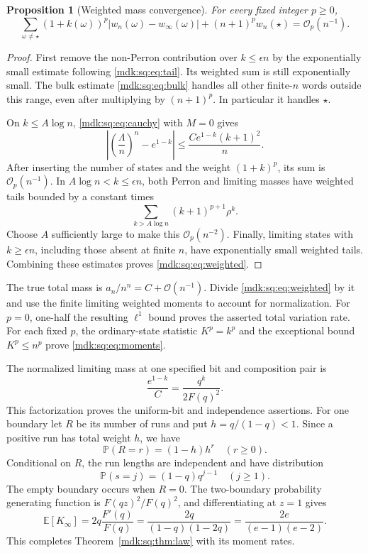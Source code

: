 \documentclass[11pt,letterpaper]{article}
\numberwithin{equation}{section}
\newtheorem{proposition}[theorem]{Proposition}
\theoremstyle{remark}\newtheorem{remark}[theorem]{Remark}
\newcommand{\Oh}{\mathcal O}\newcommand{\Q}{\mathbb Q}\newcommand{\N}{\mathbb N}\newcommand{\R}{\mathbb R}
\begin{document}
\begin{proposition}[Weighted mass convergence]\label{mdk:sq:prop:weighted}
For every fixed integer $p\ge0$,
\begin{equation}\label{mdk:sq:eq:weighted}
\sum_{\omega\ne\star}(1+k(\omega))^p
|w_n(\omega)-w_\infty(\omega)|
+(n+1)^pw_n(\star)=\Oh_p(n^{-1}).
\end{equation}
\end{proposition}
\begin{proof}
First remove the non-Perron contribution over $k\le\epsilon n$ by the exponentially small estimate following \eqref{mdk:sq:eq:tail}. Its weighted sum is still exponentially small. The bulk estimate \eqref{mdk:sq:eq:bulk} handles all other finite-$n$ words outside this range, even after multiplying by $(n+1)^p$. In particular it handles $\star$.

On $k\le A\log n$, \eqref{mdk:sq:eq:cauchy} with $M=0$ gives
\[
\left|\left(\frac\Lambda n\right)^n-e^{1-k}\right|
\le\frac{C e^{1-k}(k+1)^2}{n}.
\]
After inserting the number of states and the weight $(1+k)^p$, its sum is $\Oh_p(n^{-1})$. In $A\log n<k\le\epsilon n$, both Perron and limiting masses have weighted tails bounded by a constant times
\[
\sum_{k>A\log n}(k+1)^{p+1}\rho^k.
\]
Choose $A$ sufficiently large to make this $\Oh_p(n^{-2})$. Finally, limiting states with $k\ge\epsilon n$, including those absent at finite $n$, have exponentially small weighted tails. Combining these estimates proves \eqref{mdk:sq:eq:weighted}.
\end{proof}

The true total mass is $a_n/n^n=C+\Oh(n^{-1})$. Divide \eqref{mdk:sq:eq:weighted} by it and use the finite limiting weighted moments to account for normalization. For $p=0$, one-half the resulting $\ell^1$ bound proves the asserted total variation rate. For each fixed $p$, the ordinary-state statistic $K^p=k^p$ and the exceptional bound $K^p\le n^p$ prove \eqref{mdk:sq:eq:moments}.

The normalized limiting mass at one specified bit and composition pair is
\begin{equation}\label{mdk:sq:eq:factor-law}
\frac{e^{1-k}}C=\frac{q^k}{2F(q)^2}.
\end{equation}
This factorization proves the uniform-bit and independence assertions. For one boundary let $R$ be its number of runs and put $h=q/(1-q)<1$. Since a positive run has total weight $h$, we have
\[
\mathbb P(R=r)=(1-h)h^r\quad(r\ge0).
\]
Conditional on $R$, the run lengths are independent and have distribution
\[
\mathbb P(s=j)=(1-q)q^{j-1}\quad(j\ge1).
\]
The empty boundary occurs when $R=0$. The two-boundary probability generating function is $F(qz)^2/F(q)^2$, and differentiating at $z=1$ gives
\[
\mathbb E[K_\infty]=2q\frac{F'(q)}{F(q)}
=\frac{2q}{(1-q)(1-2q)}
=\frac{2e}{(e-1)(e-2)}.
\]
This completes Theorem~\ref{mdk:sq:thm:law} with its moment rates.
\end{document}
